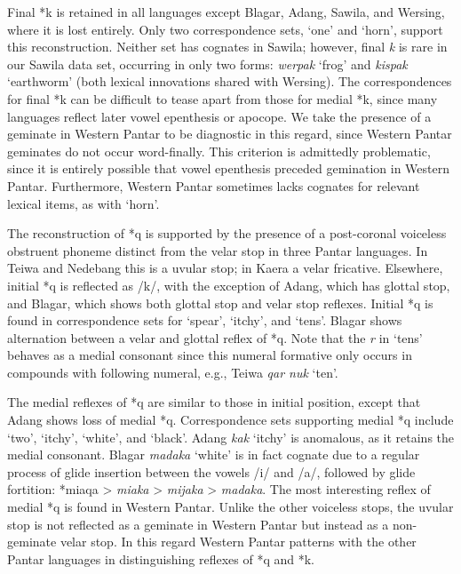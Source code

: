 Final *k is retained in all languages except Blagar, Adang, Sawila, and Wersing, where it is lost entirely. Only two correspondence sets, `one' and `horn', support this reconstruction. Neither set has cognates in Sawila; however, final \textit{k }is rare in our Sawila data set, occurring in only two forms: \textit{werpa{\textlengthmark}k }`frog' and \textit{kispa{\textlengthmark}k }`earthworm' (both lexical innovations shared with Wersing). The correspondences for final *k can be difficult to tease apart from those for medial *k, since many languages reflect later vowel epenthesis or apocope. We take the presence of a geminate in Western Pantar to be diagnostic in this regard, since Western Pantar geminates do not occur word-finally. This criterion is admittedly problematic, since it is entirely possible that vowel epenthesis preceded gemination in Western Pantar. Furthermore, Western Pantar sometimes lacks cognates for relevant lexical items, as with `horn'.

The reconstruction of *q is supported by the presence of a post-coronal voiceless obstruent phoneme distinct from the velar stop in three Pantar languages. In Teiwa and Nedebang this is a uvular stop; in Kaera a velar fricative. Elsewhere, initial *q is reflected as /k/, with the exception of Adang, which has glottal stop, and Blagar, which shows both glottal stop and velar stop reflexes. Initial *q is found in correspondence sets for `spear', `itchy', and `tens'. Blagar shows alternation between a velar and glottal reflex of *q. Note that the \textit{r} in `tens' behaves as a medial consonant since this numeral formative only occurs in compounds with following numeral, e.g., Teiwa \textit{qar nuk} `ten'.

The medial reflexes of *q are similar to those in initial position, except that Adang shows loss of medial *q. Correspondence sets supporting medial *q include `two', `itchy', `white', and `black'. Adang \textit{kak }`itchy' is anomalous, as it retains the medial consonant. Blagar \textit{mad}\textit{{\textyogh}}\textit{aka} `white' is in fact cognate due to a regular process of glide insertion between the vowels /i/ and /a/, followed by glide fortition: *miaqa {\textgreater} \textit{miaka} {\textgreater} \textit{mijaka} {\textgreater}  \textit{mad}\textit{{\textyogh}}\textit{aka}. The most interesting reflex of medial *q is found in Western Pantar. Unlike the other voiceless stops, the uvular stop is not reflected as a geminate in Western Pantar but instead as a non-geminate velar stop. In this regard Western Pantar patterns with the other Pantar languages in distinguishing reflexes of *q and *k.

